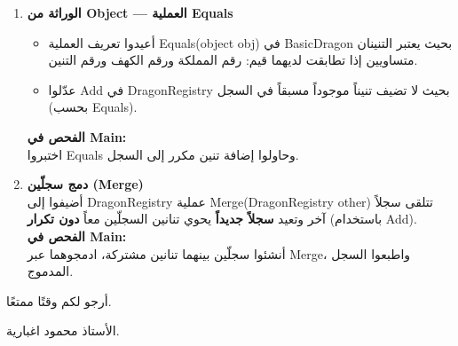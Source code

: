\documentclass[14pt]{extarticle}
\begin{document}
\begin{enumerate}[label=\textbf{تمرين \arabic*:}, wide=0pt, leftmargin=*, itemsep=2.2em]
    \item \textbf{الوراثة من \textenglish{Object} — العملية \textenglish{Equals}}
    \begin{itemize}
        \item أعيدوا تعريف العملية \textenglish{Equals(object obj)} في \textenglish{BasicDragon} بحيث يعتبر التنينان متساويين إذا تطابقت لديهما قيم: رقم المملكة ورقم الكهف ورقم التنين.
        \item عدّلوا \textenglish{Add} في \textenglish{DragonRegistry} بحيث لا تضيف تنيناً موجوداً مسبقاً في السجل (بحسب \textenglish{Equals}).
    \end{itemize}
    \textbf{الفحص في \textenglish{Main}:} \\
    اختبروا \textenglish{Equals} وحاولوا إضافة تنين مكرر إلى السجل.

    \item \textbf{دمج سجلّين (\textenglish{Merge})} \\
    أضيفوا إلى \textenglish{DragonRegistry} عملية \textenglish{Merge(DragonRegistry other)} تتلقى سجلاً آخر وتعيد \textbf{سجلاً جديداً} يحوي تنانين السجلّين معاً \textbf{دون تكرار} (باستخدام \textenglish{Add}). \\
    \textbf{الفحص في \textenglish{Main}:} \\
    أنشئوا سجلّين بينهما تنانين مشتركة، ادمجوهما عبر \textenglish{Merge}، واطبعوا السجل المدموج.

\end{enumerate}

\vspace{1cm}
\begin{flushleft}
أرجو لكم وقتًا ممتعًا.

الأستاذ محمود اغبارية.
\end{flushleft}
\end{document}
